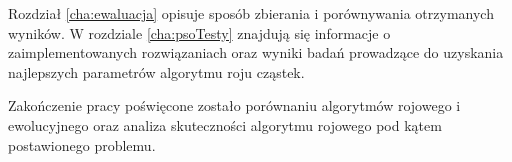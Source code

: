Rozdział \ref{cha:ewaluacja} opisuje sposób zbierania i porównywania otrzymanych wyników. W rozdziale \ref{cha:psoTesty} znajdują się informacje o zaimplementowanych rozwiązaniach oraz wyniki badań prowadzące do uzyskania najlepszych parametrów algorytmu roju cząstek.

Zakończenie pracy poświęcone zostało porównaniu algorytmów rojowego i ewolucyjnego oraz analiza skuteczności algorytmu rojowego pod kątem postawionego problemu.











